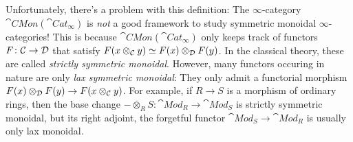 Unfortunately, there's a problem with this definition: The $\infty$-category $\cat{CMon}(\cat{Cat}_\infty)$ is \emph{not} a good framework to study symmetric monoidal $\infty$-categories! This is because $\cat{CMon}(\cat{Cat}_\infty)$ only keeps track of functors $F\colon \mathcal{C}\rightarrow \mathcal{D}$ that satisfy $F(x\otimes_{\mathcal{C}} y)\simeq F(x)\otimes_{\mathcal{D}} F(y)$. In the classical theory, these are called \emph{strictly symmetric monoidal}. However, many functors occuring in nature are only \emph{lax symmetric monoidal}: They only admit a functorial morphism $F(x)\otimes_{\mathcal{D}} F(y)\rightarrow F(x\otimes_{\mathcal{C}} y)$. For example, if $R\rightarrow S$ is a morphism of ordinary rings, then the base change $-\otimes_RS\colon \cat{Mod}_R\rightarrow \cat{Mod}_S$ is strictly symmetric monoidal, but its right adjoint, the forgetful functor $\cat{Mod}_S\rightarrow \cat{Mod}_R$ is usually only lax monoidal.

